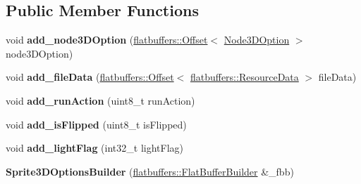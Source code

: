 \subsection*{Public Member Functions}
\begin{DoxyCompactItemize}
\item 
\mbox{\label{structflatbuffers_1_1Sprite3DOptionsBuilder_a4acd540761b4731950f4e24fb0a634c7}} 
void {\bfseries add\+\_\+node3\+D\+Option} (\hyperlink{structflatbuffers_1_1Offset}{flatbuffers\+::\+Offset}$<$ \hyperlink{structflatbuffers_1_1Node3DOption}{Node3\+D\+Option} $>$ node3\+D\+Option)
\item 
\mbox{\label{structflatbuffers_1_1Sprite3DOptionsBuilder_a9ba2cfa1ac7411fd3ec154bef46b816f}} 
void {\bfseries add\+\_\+file\+Data} (\hyperlink{structflatbuffers_1_1Offset}{flatbuffers\+::\+Offset}$<$ \hyperlink{structflatbuffers_1_1ResourceData}{flatbuffers\+::\+Resource\+Data} $>$ file\+Data)
\item 
\mbox{\label{structflatbuffers_1_1Sprite3DOptionsBuilder_a7127429580634dd3511e4075cab148e0}} 
void {\bfseries add\+\_\+run\+Action} (uint8\+\_\+t run\+Action)
\item 
\mbox{\label{structflatbuffers_1_1Sprite3DOptionsBuilder_a2f37d18d37d2f574f33e2c189e9e294e}} 
void {\bfseries add\+\_\+is\+Flipped} (uint8\+\_\+t is\+Flipped)
\item 
\mbox{\label{structflatbuffers_1_1Sprite3DOptionsBuilder_a3260c5ea40d28bc2e3ce8bdb63ea821e}} 
void {\bfseries add\+\_\+light\+Flag} (int32\+\_\+t light\+Flag)
\item 
\mbox{\label{structflatbuffers_1_1Sprite3DOptionsBuilder_af546810cabbde1082a2d323b625a9d52}} 
{\bfseries Sprite3\+D\+Options\+Builder} (\hyperlink{classflatbuffers_1_1FlatBufferBuilder}{flatbuffers\+::\+Flat\+Buffer\+Builder} \&\+\_\+fbb)
\item 
\mbox{\label{structflatbuffers_1_1Sprite3DOptionsBuilder_aec4ec738a87d48d06704505a1cf1beb4}} 

\end{DoxyCompactItemize}
